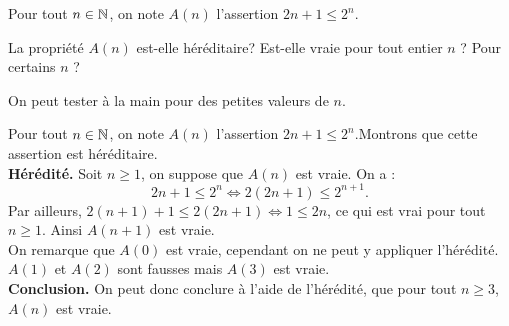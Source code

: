 \begin{exo}
Pour tout $n \in \mathbb N$, on note $A(n)$ l'assertion \og $2n+1 \leq 2^n$.\fg

La propriété $A(n)$ est-elle héréditaire? Est-elle vraie pour tout entier $n$ ? Pour certains $n$ ?

\begin{hint}
On peut tester à la main pour des petites valeurs de $n$.
\end{hint}
\begin{sol}
Pour tout $n \in \mathbb N$, on note $A(n)$ l'assertion \og $2n+1 \leq 2^n$.\fg Montrons que cette assertion est héréditaire.\\ 
\textbf{Hérédité.} Soit $n \geq 1$, on suppose que $A(n)$ est vraie. On a : 
$$2n+1 \leq 2^n \Leftrightarrow 2(2n+1) \leq 2^{n+1}.$$
Par ailleurs, $2(n+1)+1 \leq 2(2n+1) \Leftrightarrow 1 \leq 2n$, ce qui est vrai pour tout $n \geq 1$.
Ainsi $A(n+1)$ est vraie.\\
On remarque que $A(0)$ est vraie, cependant on ne peut y appliquer l'hérédité. $A(1)$ et $A(2)$ sont fausses mais $A(3)$ est vraie. \\
\textbf{Conclusion.} On peut donc conclure à l'aide de l'hérédité, que pour tout $n \geq 3$, $A(n)$ est vraie.
\end{sol}
\end{exo}





